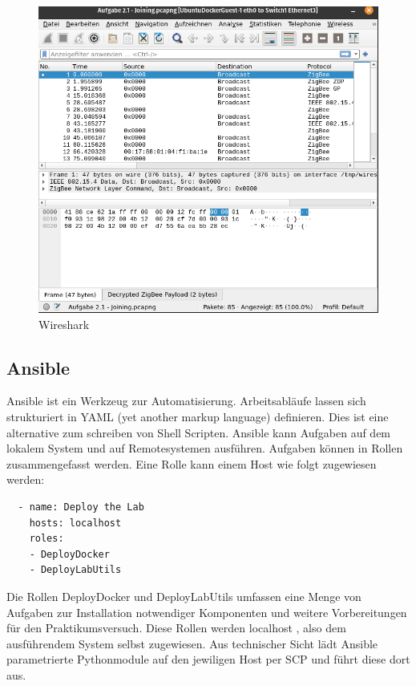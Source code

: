 \begin{figure}[H]
  \centering
  \includegraphics[width=1\textwidth]{media/wireshark.png}
  \caption{Wireshark}
\end{figure}

\subsection{Ansible}

Ansible ist ein Werkzeug zur Automatisierung. Arbeitsabläufe lassen sich strukturiert in YAML (yet another markup language) definieren. Dies ist eine alternative zum schreiben
von Shell Scripten. Ansible kann Aufgaben auf dem lokalem System und auf Remotesystemen ausführen. Aufgaben können in Rollen zusammengefasst werden.  
Eine Rolle kann einem Host wie folgt zugewiesen werden:
\begin{lstlisting}
  - name: Deploy the Lab
    hosts: localhost
    roles:
    - DeployDocker
    - DeployLabUtils
\end{lstlisting}

Die Rollen \grqq DeployDocker\grqq{} und \grqq DeployLabUtils\grqq{} umfassen eine Menge von Aufgaben zur Installation notwendiger Komponenten und weitere Vorbereitungen
für den Praktikumsversuch. Diese Rollen werden \grqq localhost \grqq{}, also dem ausführendem System selbst zugewiesen.
Aus technischer Sicht lädt Ansible parametrierte Pythonmodule auf den jewiligen Host per SCP und führt diese dort aus.


